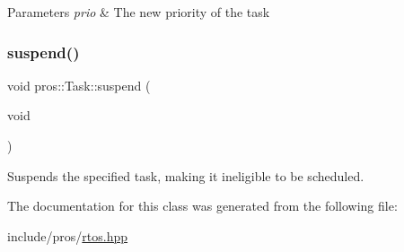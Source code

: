 \begin{DoxyParams}{Parameters}
{\em prio} & The new priority of the task \\
\hline
\end{DoxyParams}
\mbox{\label{classpros_1_1Task_a89005762dcd3026c953ae5eedd7ecd97}} 
\subsubsection{\texorpdfstring{suspend()}{suspend()}}
{\footnotesize\ttfamily void pros\+::\+Task\+::suspend (\begin{DoxyParamCaption}\item[{void}]{ }\end{DoxyParamCaption})}



Suspends the specified task, making it ineligible to be scheduled. 



The documentation for this class was generated from the following file\+:\begin{DoxyCompactItemize}
\item 
include/pros/\mbox{\hyperlink{rtos_8hpp}{rtos.\+hpp}}\end{DoxyCompactItemize}
